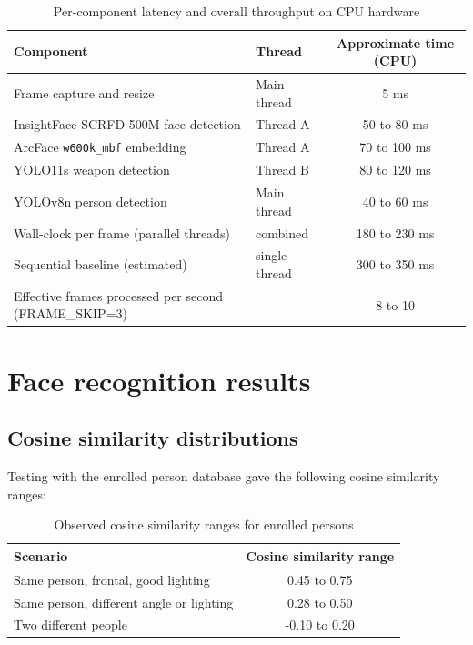 \documentclass[12pt,a4paper]{report}
\begin{document}
\begin{table}[htbp]
\centering
\begin{tabular}{|l|l|c|}
\hline
\textbf{Component} & \textbf{Thread} & \textbf{Approximate time (CPU)} \\
\hline
Frame capture and resize                     & Main thread   & 5 ms \\
InsightFace SCRFD-500M face detection        & Thread A      & 50 to 80 ms \\
ArcFace \texttt{w600k\_mbf} embedding        & Thread A      & 70 to 100 ms \\
YOLO11s weapon detection                     & Thread B      & 80 to 120 ms \\
YOLOv8n person detection                     & Main thread   & 40 to 60 ms \\
\hline
Wall-clock per frame (parallel threads)      & combined      & 180 to 230 ms \\
Sequential baseline (estimated)              & single thread & 300 to 350 ms \\
\hline
Effective frames processed per second (FRAME\_SKIP=3) & & 8 to 10 \\
\hline
\end{tabular}
\caption{Per-component latency and overall throughput on CPU hardware}
\label{tab:throughput}
\end{table}

\section{Face recognition results}

\subsection{Cosine similarity distributions}

Testing with the enrolled person database gave the following cosine similarity ranges:

\begin{table}[htbp]
\centering
\begin{tabular}{|l|c|}
\hline
\textbf{Scenario} & \textbf{Cosine similarity range} \\
\hline
Same person, frontal, good lighting            & 0.45 to 0.75 \\
Same person, different angle or lighting       & 0.28 to 0.50 \\
Two different people                           & -0.10 to 0.20 \\
\hline
\end{tabular}
\caption{Observed cosine similarity ranges for enrolled persons}
\label{tab:cosim_dist}
\end{table}
\end{document}
